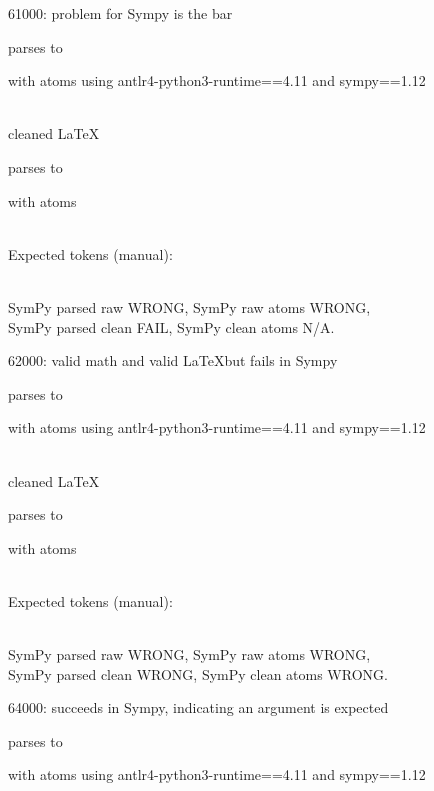 \documentclass{article}
\begin{document}
\hrulefill

61000:
problem for Sympy is the bar

parses to

with atoms
using antlr4-python3-runtime==4.11 and sympy==1.12

\ \\
cleaned \LaTeX

parses to

with atoms


\ \\
Expected tokens (manual):


\ \\
SymPy parsed raw WRONG, 
SymPy raw atoms WRONG, \\
SymPy parsed clean FAIL, 
SymPy clean atoms N/A.

\hrulefill

62000: 
valid math and valid \LaTeX but fails in Sympy

parses to

with atoms
using antlr4-python3-runtime==4.11 and sympy==1.12

\ \\
cleaned \LaTeX

parses to

with atoms


\ \\
Expected tokens (manual):



\ \\
SymPy parsed raw WRONG, 
SymPy raw atoms WRONG, \\
SymPy parsed clean WRONG, 
SymPy clean atoms WRONG.

\hrulefill


64000: 
succeeds in Sympy, indicating an argument is expected

parses to

with atoms
using antlr4-python3-runtime==4.11 and sympy==1.12
\end{document}
